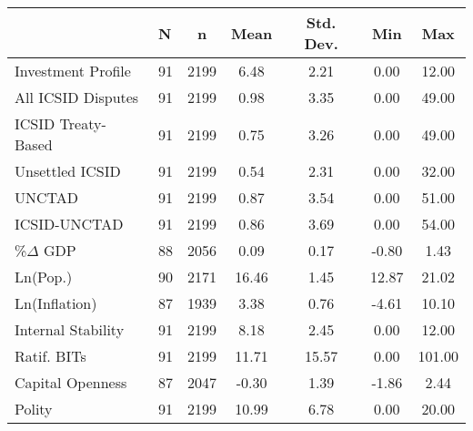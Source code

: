 \begin{table}[ht]
\centering
{\footnotesize
\begin{tabular}{llccccc}
  & N & n & Mean & Std. Dev. & Min & Max \\ 
  \hline
\hline
Investment Profile & 91 & 2199 & 6.48 & 2.21 & 0.00 & 12.00 \\ 
  All ICSID Disputes & 91 & 2199 & 0.98 & 3.35 & 0.00 & 49.00 \\ 
  ICSID Treaty-Based & 91 & 2199 & 0.75 & 3.26 & 0.00 & 49.00 \\ 
  Unsettled ICSID & 91 & 2199 & 0.54 & 2.31 & 0.00 & 32.00 \\ 
  UNCTAD & 91 & 2199 & 0.87 & 3.54 & 0.00 & 51.00 \\ 
  ICSID-UNCTAD & 91 & 2199 & 0.86 & 3.69 & 0.00 & 54.00 \\ 
  \%$\Delta$ GDP & 88 & 2056 & 0.09 & 0.17 & -0.80 & 1.43 \\ 
  Ln(Pop.) & 90 & 2171 & 16.46 & 1.45 & 12.87 & 21.02 \\ 
  Ln(Inflation) & 87 & 1939 & 3.38 & 0.76 & -4.61 & 10.10 \\ 
  Internal Stability & 91 & 2199 & 8.18 & 2.45 & 0.00 & 12.00 \\ 
  Ratif. BITs & 91 & 2199 & 11.71 & 15.57 & 0.00 & 101.00 \\ 
  Capital Openness & 87 & 2047 & -0.30 & 1.39 & -1.86 & 2.44 \\ 
  Polity & 91 & 2199 & 10.99 & 6.78 & 0.00 & 20.00 \\ 
   \hline
\hline
\end{tabular}
}
\end{table}
